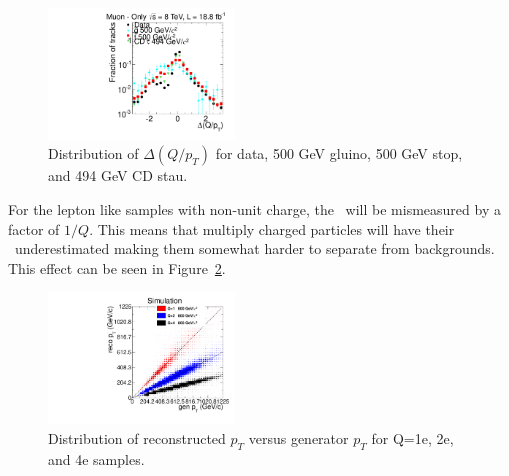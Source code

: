 \begin{figure}
 \begin{center}
  \includegraphics[width=0.44\textwidth]{figures/muonly/Selection_Comp_Signal_8TeV_InnerInvPtDiff_BS}
 \end{center}
 \caption{Distribution of $\Delta(Q/p_T)$
    for data, 500 GeV gluino, 500 GeV stop, and 494 GeV CD stau.
    \label{fig:MuOnlyInvPtDiff}}
\end{figure}

For the lepton like samples with non-unit charge, the \pt\ will be mismeasured by a factor of $1/Q$. This means that multiply 
charged particles will have their \pt\ underestimated making them somewhat harder to separate from backgrounds.
This effect can be seen in Figure~\ref{fig:RecoGenPt}.

\begin{figure}
 \begin{center}
  \includegraphics[width=0.44\textwidth]{figures/tkonly/SIM_Validation_Pt.pdf}
 \end{center}
 \caption{Distribution of reconstructed $p_T$ versus generator $p_T$ for Q=1e, 2e, and 4e samples.
    \label{fig:RecoGenPt}}
\end{figure}

